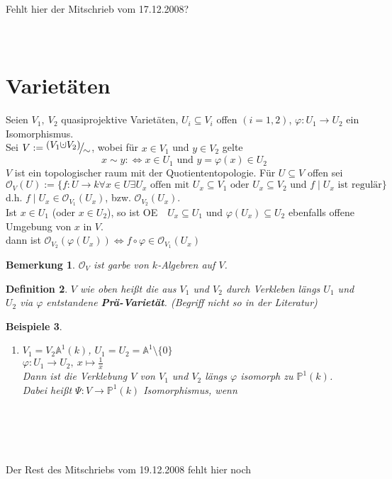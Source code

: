 \documentclass[a4paper,12pt]{report}
\theoremstyle{break}
\newtheorem{Def}{Definition}[section]
\newtheorem{Bem}[Def]{Bemerkung}
\newtheorem{Bsp}[Def]{Beispiele}
\theoremstyle{nonumberbreak}
\theoremstyle{nonumberplain}
\newcommand{\emp}[1]{\textbf{\emph{#1}}}
\newcommand{\begriff}[1]{{\index{#1}}\emp{#1}}
\newcommand{\cupdot}{\ensuremath{\mathaccent\cdot\cup}}
\newcommand{\FakRaum}[2]{
  \raisebox{0.7ex}{\ensuremath{#1}}
  \ensuremath{\mkern-3mu}\big/\ensuremath{\mkern-3mu}
  \raisebox{-0.6ex}{\ensuremath{#2}}}
\renewcommand{\OE}{O\!\!E}
\begin{document}
\\
\\
\\
\\
\Large{Fehlt hier der Mitschrieb vom 17.12.2008?}
\\
\\
\\
\section{Varietäten}

Seien $V_1,~V_2$ quasiprojektive Varietäten, $U_i\subseteq V_i$ offen $(i=1,2)$, $\varphi: U_1 \rightarrow U_2$ ein Isomorphismus.\\
Sei $V:=\FakRaum{(V_1\cupdot V_2)}{\sim}$, wobei für $x\in V_1$ und $y\in V_2$ gelte 
$$x\sim y :\Leftrightarrow x\in U_1 \text{ und } y=\varphi(x)\in U_2$$
$V$ ist ein topologischer raum mit der Quotiententopologie.
Für $U\subseteq V$ offen sei
$$\mathcal{O}_V(U):=\{f: U\rightarrow k \forall x\in U \exists U_x \text{ offen mit } U_x\subseteq V_1 \text{ oder } U_x\subseteq V_2 \text{ und } f\mid U_x \text{ ist regulär}\}$$
d.h. $f\mid U_x\in\mathcal{O}_{V_1}(U_x)$, bzw. $\mathcal{O}_{V_2}(U_x)$.\\
Ist $x\in U_1$ (oder $x\in U_2$), so ist \OE~~$U_x\subseteq U_1$ und $\varphi(U_x)\subseteq U_2$ ebenfalls offene Umgebung von $x$ in $V$.\\
dann ist $\mathcal{O}_{V_2}(\varphi(U_x))\Leftrightarrow f\circ\varphi\in\mathcal{O}_{V_1}(U_x)$
\begin{Bem}
\label{bem:13.1}
$\mathcal{O}_V$ ist garbe von $k$-Algebren auf $V$.
\end{Bem}

\begin{Def}
\label{def:13.2}
$V$ wie oben heißt die aus $V_1$ und $V_2$ durch Verkleben längs $U_1$ und $U_2$ via $\varphi$ entstandene \begriff{Prä-Varietät}. (Begriff nicht so in der Literatur) 
\end{Def}

\begin{Bsp}
\begin{enumerate}
\item $V_1=V_2\mathbb{A}^1(k)$, $U_1=U_2=\mathbb{A}^1\setminus\{0\}$\\
$\varphi:U_1\rightarrow U_2,~x\mapsto\frac{1}{x}$\\
Dann ist die Verklebung $V$ von $V_1$ und $V_2$ längs $\varphi$ isomorph zu $\mathbb{P}^1(k)$.\\
Dabei heißt $\Psi:V\rightarrow\mathbb{P}^1(k)$ Isomorphismus, wenn 
\end{enumerate}
\end{Bsp}
~\\
\\
\\
\\
\Large{Der Rest des Mitschriebs vom 19.12.2008 fehlt hier noch}
~\\
\\
\\
\\
\end{document}
